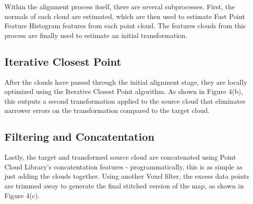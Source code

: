 \documentclass[letterpaper, oneside, 10pt]{report}
\begin{document}
\noindent Within the alignment process itself, there are several subprocesses. First, the normals of each cloud are estimated, which are then used to estimate Fast Point Feature Histogram \cite{rusu2009fast, rusu2009fastlabel} features from each point cloud. The features clouds from this process are finally used to estimate an initial transformation.

\subsection{Iterative Closest Point}

\noindent After the clouds have passed through the initial alignment stage, they are locally optimized using the Iterative Closest Point algorithm. As shown in Figure 4(b), this outputs a second transformation applied to the source cloud that eliminates narrower errors on the transformation compared to the target cloud.

\subsection{Filtering and Concatentation}

Lastly, the target and transformed source cloud are concatenated using Point Cloud Library's concatentation features - programmatically, this is as simple as just adding the clouds together. Using another Voxel filter, the excess data points are trimmed away to generate the final stitched version of the map, as shown in Figure 4(c). \\
\end{document}
